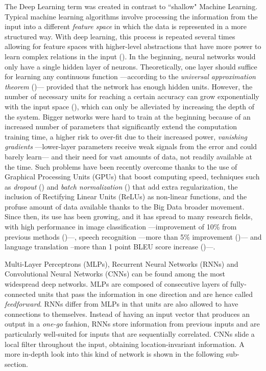 The Deep Learning term was created in contrast to ``shallow" Machine Learning. Typical machine learning algorithms involve processing the information from the input into a different \textit{feature space} in which the data is represented in a more structured way. With deep learning, this process is repeated several times allowing for feature spaces with higher-level abstractions that have more power to learn complex relations in the input (\cite{Goodfellow-et-al-2016}). In the beginning, neural networks would only have a single hidden layer of neurons. Theoretically, one layer should suffice for learning any continuous function ---according to the \textit{universal approximation theorem} (\cite{Cybenko1989})--- provided that the network has enough hidden units. However, the number of necessary units for reaching a certain accuracy can grow exponentially with the input space (\cite{Barron1993}), which can only be alleviated by increasing the depth of the system. Bigger networks were hard to train at the beginning because of an increased number of parameters that significantly extend the computation training time, a higher risk to over-fit due to their increased power, \textit{vanishing gradients} ---lower-layer parameters receive weak signals from the error and could barely learn--- and their need for vast amounts of data, not readily available at the time. Such problems have been recently overcome thanks to the use of Graphical Processing Units (GPUs) that boost computing speed, techniques such as \textit{dropout} (\cite{Srivastava2014}) and \textit{batch normalization} (\cite{SergeyIoffe2015}) that add extra regularization, the inclusion of Rectifying Linear Units (ReLUs) as non-linear functions, and the profuse amount of data available thanks to the Big Data broader movement. Since then, its use has been growing, and it has spread to many research fields, with high performance in image classification ---improvement of 10\% from previous methods (\cite{NIPS2012_4824})---, speech recognition ---more than 5\% improvement (\cite{Vesely2013})--- and language translation --more than 1 point BLEU score increase (\cite{Cho2014})---.

Multi-Layer Perceptrons (MLPs), Recurrent Neural Networks (RNNs) and Convolutional Neural Networks (CNNs) can be found among the most widespread deep networks. MLPs are composed of consecutive layers of fully-connected units that pass the information in one direction and are hence called \textit{feedforward}. RNNs differ from MLPs in that units are also allowed to have connections to themselves. Instead of having an input vector that produces an output in a \textit{one-go} fashion, RNNs store information from previous inputs and are particularly well-suited for inputs that are sequentially correlated. CNNs slide a local filter throughout the input, obtaining location-invariant information. A more in-depth look into this kind of network is shown in the following sub-section.

